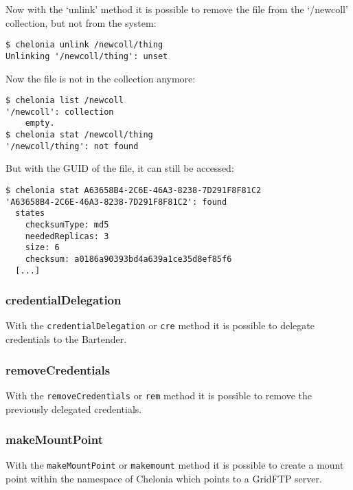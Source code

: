 Now with the `unlink' method it is possible to remove the file from the `/newcoll' collection, but not from the system:
\begin{verbatim}
$ chelonia unlink /newcoll/thing
Unlinking '/newcoll/thing': unset
\end{verbatim}

Now the file is not in the collection anymore:
\begin{verbatim}
$ chelonia list /newcoll
'/newcoll': collection
    empty.
$ chelonia stat /newcoll/thing
'/newcoll/thing': not found
\end{verbatim}

But with the GUID of the file, it can still be accessed:
\begin{verbatim}
$ chelonia stat A63658B4-2C6E-46A3-8238-7D291F8F81C2
'A63658B4-2C6E-46A3-8238-7D291F8F81C2': found
  states
    checksumType: md5
    neededReplicas: 3
    size: 6
    checksum: a0186a90393bd4a639a1ce35d8ef85f6
  [...]
\end{verbatim}

\subsubsection{credentialDelegation} %
\label{ssub:credentialdelegation}
With the \texttt{credentialDelegation} or \texttt{cre} method it is possible to delegate credentials to the Bartender.
\hspace*{0.5cm}
\begin{shaded}
\end{shaded}

\subsubsection{removeCredentials} %
\label{ssub:removecredentials}
With the \texttt{removeCredentials} or \texttt{rem} method it is possible to remove the previously delegated credentials.
\hspace*{0.5cm}
\begin{shaded}
\end{shaded}

\subsubsection{makeMountPoint} %
\label{ssub:makemountpoint}
With the \texttt{makeMountPoint} or \texttt{makemount} method it is possible to create a mount point within the namespace of Chelonia which points to a GridFTP server.
\hspace*{0.5cm}
\begin{shaded}
\end{shaded}

